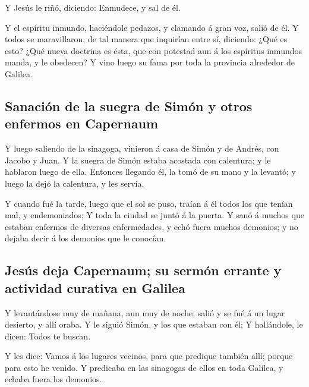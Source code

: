  Y Jesús le riñó, diciendo: Enmudece, y sal de él.

 Y el espíritu inmundo, haciéndole pedazos, y clamando á
gran voz, salió de él.  Y todos se maravillaron, de tal
manera que inquirían entre sí, diciendo: ¿Qué es esto? ¿Qué nueva
doctrina es ésta, que con potestad aun á los espíritus inmundos manda, y
le obedecen?  Y vino luego su fama por toda la provincia
alrededor de Galilea.

\hypertarget{sanaciuxf3n-de-la-suegra-de-simuxf3n-y-otros-enfermos-en-capernaum}{%
\subsection{Sanación de la suegra de Simón y otros enfermos en
Capernaum}\label{sanaciuxf3n-de-la-suegra-de-simuxf3n-y-otros-enfermos-en-capernaum}}

 Y luego saliendo de la sinagoga, vinieron á casa de
Simón y de Andrés, con Jacobo y Juan.  Y la suegra de
Simón estaba acostada con calentura; y le hablaron luego de ella.
 Entonces llegando él, la tomó de su mano y la levantó; y
luego la dejó la calentura, y les servía.

 Y cuando fué la tarde, luego que el sol se puso, traían
á él todos los que tenían mal, y endemoniados;  Y toda la
ciudad se juntó á la puerta.  Y sanó á muchos que estaban
enfermos de diversas enfermedades, y echó fuera muchos demonios; y no
dejaba decir á los demonios que le conocían.

\hypertarget{jesuxfas-deja-capernaum-su-sermuxf3n-errante-y-actividad-curativa-en-galilea}{%
\subsection{Jesús deja Capernaum; su sermón errante y actividad curativa
en
Galilea}\label{jesuxfas-deja-capernaum-su-sermuxf3n-errante-y-actividad-curativa-en-galilea}}

 Y levantándose muy de mañana, aun muy de noche, salió y
se fué á un lugar desierto, y allí oraba.  Y le siguió
Simón, y los que estaban con él;  Y hallándole, le dicen:
Todos te buscan.

 Y les dice: Vamos á los lugares vecinos, para que
predique también allí; porque para esto he venido.  Y
predicaba en las sinagogas de ellos en toda Galilea, y echaba fuera los
demonios.

